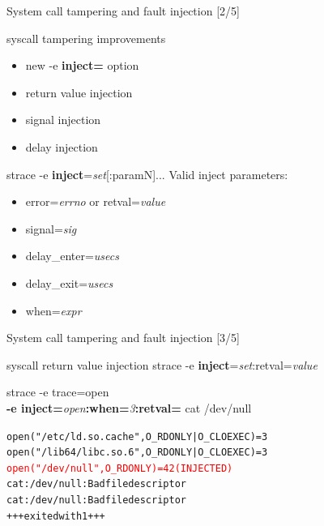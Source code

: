 \documentclass[unicode]{beamer}
\begin{document}
\begin{frame}[fragile]{System call tampering and fault injection \hfill [2/5]}
\begin{block}{\large syscall tampering improvements}
\begin{itemize}
	\item new -e \textbf{inject=} option
	\item return value injection
	\item signal injection
	\item delay injection
\end{itemize}
\end{block}

\begin{block}{\large strace -e \textbf{inject}=\textit{set}[:paramN]...}
Valid inject parameters:
\begin{itemize}
\item error=\textit{errno} or retval=\textit{value}
\item signal=\textit{sig}
\item delay\_enter=\textit{usecs}
\item delay\_exit=\textit{usecs}
\item when=\textit{expr}
\end{itemize}
\end{block}
\end{frame}

\begin{frame}[fragile]{System call tampering and fault injection \hfill [3/5]}
\begin{block}{\large syscall return value injection}
strace -e \textbf{inject}=\textit{set}:retval=\textit{value}
\end{block}

\begin{block}{\large strace -e trace=open \\ {\bf -e inject=}{\it open}{\bf :when=}{\it 3}{\bf :retval=}{}
cat /dev/null}
\begin{alltt}
open("/etc/ld.so.cache", O_RDONLY|O_CLOEXEC) = 3
open("/lib64/libc.so.6", O_RDONLY|O_CLOEXEC) = 3
\textcolor{red}{open("/dev/null", O_RDONLY)             = 42 (INJECTED)}
cat: /dev/null: Bad file descriptor
cat: /dev/null: Bad file descriptor
+++ exited with 1 +++
\end{alltt}
\end{block}
\end{frame}
\end{document}
